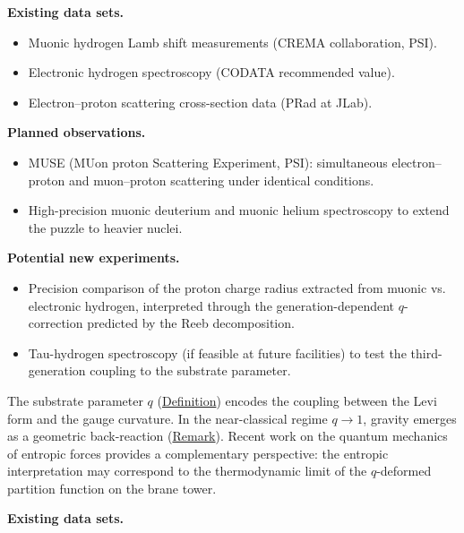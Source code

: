 \textbf{Existing data sets.}

\begin{itemize}
  \item Muonic hydrogen Lamb shift measurements (CREMA collaboration, PSI).
  \item Electronic hydrogen spectroscopy (CODATA recommended value).
  \item Electron--proton scattering cross-section data (PRad at JLab).
\end{itemize}

\textbf{Planned observations.}

\begin{itemize}
  \item MUSE (MUon proton Scattering Experiment, PSI): simultaneous electron--proton and muon--proton scattering under identical conditions.
  \item High-precision muonic deuterium and muonic helium spectroscopy to extend the puzzle to heavier nuclei.
\end{itemize}

\textbf{Potential new experiments.}

\begin{itemize}
  \item Precision comparison of the proton charge radius extracted from muonic vs. electronic hydrogen, interpreted through the generation-dependent $q$-correction predicted by the Reeb decomposition.
  \item Tau-hydrogen spectroscopy (if feasible at future facilities) to test the third-generation coupling to the substrate parameter.
\end{itemize}

\begin{remark}
  \label{rem:entropic-gravity}
The substrate parameter $q$ (\hyperref[def:substrate-parameter]{Definition}) encodes
the coupling between the Levi form and the gauge curvature. In the
near-classical regime $q \to 1$, gravity emerges as a geometric back-reaction
(\hyperref[rem:gr-substrate-geometry]{Remark}). Recent work on the quantum mechanics
of entropic forces provides a complementary perspective: the
entropic interpretation may correspond to the thermodynamic limit of the
$q$-deformed partition function on the brane tower.
\end{remark}

\textbf{Existing data sets.}

